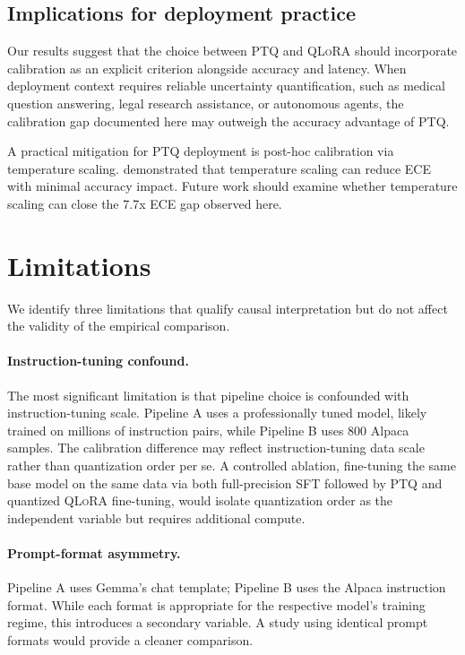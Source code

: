\documentclass[10pt]{article}
\newcommand{\ptq}{\textsc{PTQ}}
\newcommand{\qlora}{\textsc{QLoRA}}
\newcommand{\ece}{\textsc{ECE}}
\begin{document}
\subsection{Implications for deployment practice}

Our results suggest that the choice between \ptq{} and \qlora{} should incorporate calibration as an explicit criterion alongside accuracy and latency. When deployment context requires reliable uncertainty quantification, such as medical question answering, legal research assistance, or autonomous agents, the calibration gap documented here may outweigh the accuracy advantage of \ptq.

A practical mitigation for \ptq{} deployment is post-hoc calibration via temperature scaling. \citet{guo2017calibration} demonstrated that temperature scaling can reduce \ece{} with minimal accuracy impact. Future work should examine whether temperature scaling can close the 7.7x \ece{} gap observed here.

\section{Limitations}
\label{sec:limitations}

We identify three limitations that qualify causal interpretation but do not affect the validity of the empirical comparison.

\paragraph{Instruction-tuning confound.}
The most significant limitation is that pipeline choice is confounded with instruction-tuning scale. Pipeline A uses a professionally tuned model, likely trained on millions of instruction pairs, while Pipeline B uses 800 Alpaca samples. The calibration difference may reflect instruction-tuning data scale rather than quantization order per se. A controlled ablation, fine-tuning the same base model on the same data via both full-precision SFT followed by \ptq{} and quantized \qlora{} fine-tuning, would isolate quantization order as the independent variable but requires additional compute.

\paragraph{Prompt-format asymmetry.}
Pipeline A uses Gemma's chat template; Pipeline B uses the Alpaca instruction format. While each format is appropriate for the respective model's training regime, this introduces a secondary variable. A study using identical prompt formats would provide a cleaner comparison.
\end{document}
